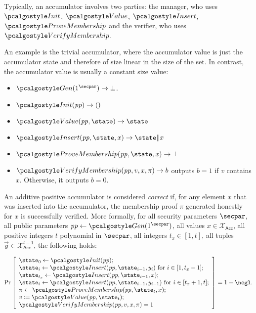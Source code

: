 Typically, an accumulator involves two parties: the manager, who uses $\algo{Init}$, $\algo{Value}$, $\algo{Insert}$, $\algo{ProveMembership}$ and the verifier, who uses $\algo{VerifyMembership}$.

\begin{example}
  An example is the trivial accumulator\label{sec:trivial-acc}, where the accumulator value is just the accumulator state and therefore of size linear in the size of the set. In contrast, the accumulator value is usually a constant size value:
  \begin{itemize}
    \item $\algo{Gen}(1^\secpar)\rightarrow \bot$.
    \item $\algo{Init}(\params)\rightarrow ()$
    \item $\algo{Value}(\params, \state)\rightarrow \state$
    \item $\algo{Insert}(\params, \state, x) \rightarrow \state \| x$
    \item $\algo{ProveMembership}(\params, \state, x) \rightarrow \bot$
    \item $\algo{VerifyMembership}(\params, v, x, \pi) \rightarrow b$ outputs $b = 1$ if $v$ contains $x$. Otherwise, it outputs $b = 0$.
  \end{itemize}
\end{example}

\begin{definition}[Correctness]
An additive positive accumulator is considered \emph{correct} if, for any element $x$ that was inserted into the accumulator, the membership proof $\pi$ generated honestly for $x$ is successfully verified.
More formally, for all security parameters $\secpar$, all public parameters $\params \gets \algo{Gen}(1^\secpar)$, all values $x \in \mathcal{X}_\mathsf{Acc}$, all positive integers $t$ polynomial in $\secpar$, all integers $t_x \in [1, t]$, all tuples $\vec{y} \in \mathcal{X}_\mathsf{Acc}^{t- 1}$, the following holds:

\[
    \Pr\left[
    \begin{array}{l}
        \state_0 \gets \algo{Init}(\params); \\
        \state_i \gets \algo{Insert}(\params, \state_{i - 1}, y_i) \text{ for } i \in [1, t_x - 1]; \\
        \state_{t_x} \gets \algo{Insert}(\params, \state_{i - 1}, x); \\
        \state_i \gets \algo{Insert}(\params, \state_{i - 1}, y_{i - 1}) \text{ for } i \in [t_x + 1, t]; \\
        \pi \gets \algo{ProveMembership}(\params, \state_t, x); \\
        v \defeq \algo{Value}(\params, \state_t); \\
        \algo{VerifyMembership}(\params, v, x, \pi) = 1
    \end{array}
    \right] = 1 - \negl.
\]
\end{definition}

